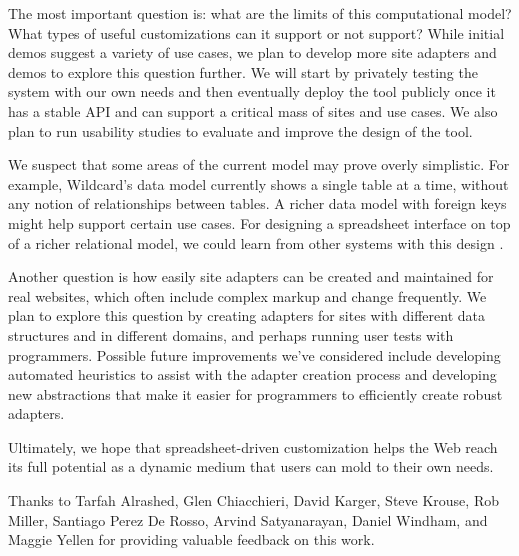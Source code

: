 \documentclass[english,submission]{programming}
\begin{document}
The most important question is: what are the limits of this
computational model? What types of useful customizations can it support
or not support? While initial demos suggest a variety of use cases, we
plan to develop more site adapters and demos to explore this question
further. We will start by privately testing the system with our own
needs and then eventually deploy the tool publicly once it has a stable
API and can support a critical mass of sites and use cases. We also plan
to run usability studies to evaluate and improve the design of the tool.

We suspect that some areas of the current model may prove overly
simplistic. For example, Wildcard's data model currently shows a single
table at a time, without any notion of relationships between tables. A
richer data model with foreign keys might help support certain use
cases. For designing a spreadsheet interface on top of a richer
relational model, we could learn from other systems with this design
\autocite{mccutchen2016,bakke2016}.

Another question is how easily site adapters can be created and
maintained for real websites, which often include complex markup and
change frequently. We plan to explore this question by creating adapters
for sites with different data structures and in different domains, and
perhaps running user tests with programmers. Possible future
improvements we've considered include developing automated heuristics to
assist with the adapter creation process and developing new abstractions
that make it easier for programmers to efficiently create robust
adapters.

Ultimately, we hope that spreadsheet-driven customization helps the Web
reach its full potential as a dynamic medium that users can mold to
their own needs.

\acks
Thanks to Tarfah Alrashed, Glen Chiacchieri, David Karger, Steve Krouse, Rob Miller, Santiago Perez De Rosso, Arvind Satyanarayan, Daniel Windham, and Maggie Yellen for providing valuable feedback on this work.

\printbibliography
\end{document}
